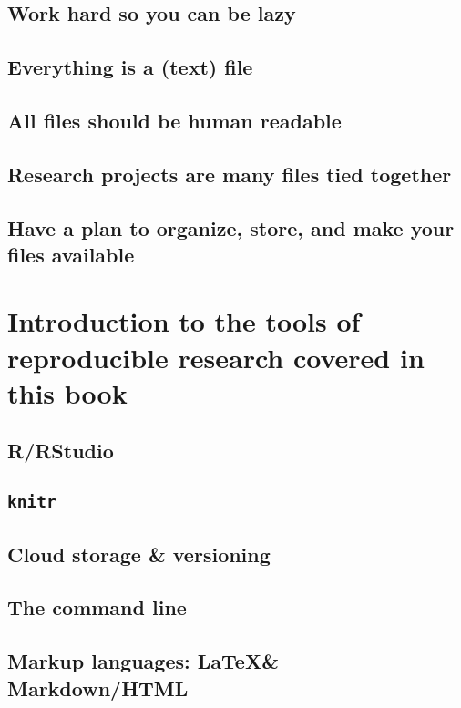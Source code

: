 \documentclass[ChapterTOCs,krantz1]{krantz}\usepackage{graphicx, color}
\begin{document}
\subsection{Work hard so you can be lazy}

\subsection{Everything is a (text) file}

\subsection{All files should be human readable}

\subsection{Research projects are many files tied together}

\subsection{Have a plan to organize, store, and make your files
available}

\section{Introduction to the tools of reproducible research covered in
this book}

\subsection{\textbf{R}/\textbf{RStudio}}

\subsection{\texttt{knitr}}

\subsection{Cloud storage \& versioning}

\subsection{The command line}

\subsection{Markup languages: \LaTeX \& Markdown/HTML}
\end{document}
